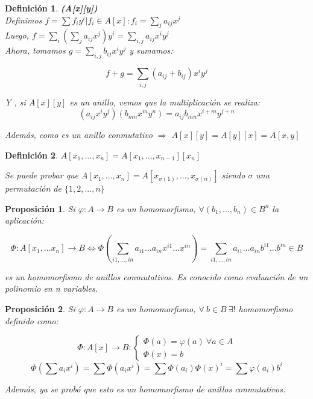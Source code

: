 \documentclass[11pt, a4paper, titlepage]{article}
\theoremstyle{theorem-style}
\newtheorem*{nprop}{Proposición}
\theoremstyle{definition-style}
\newtheorem*{ndef}{Definición}
\theoremstyle{remark-style}
\theoremstyle{example-style}
\begin{document}
\begin{ndef} \textbf{(A[x][y])}
\hfill \\
Definimos $f=\sum f_i y^i | f_i \in A[x] : f_i = \sum_j a_{ij}x^j$\\
Luego, $f = \sum_i (\sum_j a_{ij}x^j)y^i = \sum_{i,j} a_{ij}x^iy^j$\\

Ahora, tomamos $g =\sum_{i,j} b_{ij}x^iy^j$ y sumamos:

\[
f+g = \sum_{i,j}(a_{ij}+b_{ij})x^iy^j
\]

Y , si $A[x][y]$ es un anillo, vemos que la multiplicación se realiza:
\[
(a_{ij}x^iy^j)(b_{mn}x^my^n) = a_{ij}b_{mn} x^{i+m}y^{j+n}
\]


Además, como es un anillo conmutativo $\Rightarrow$ $A[x][y] = A[y][x] = A[x,y]$

	
\end{ndef}


\begin{ndef}
	$A[x_1,...,x_n] = A[x_1,...,x_{n-1}][x_n]$

Se puede probar que $A[x_1,...,x_n] = A[x_{\sigma(1)},...,x_{\sigma(n)}]$ siendo $\sigma$ una permutación de $\{1,2,...,n \}$
\end{ndef}

\newpage

\begin{nprop}
	
Si $\varphi :A \to B$ es un homomorfismo, $\forall(b_1,...,b_n) \in B^n$ la aplicación:

\[
\Phi:A[x_1,...x_n] \to B \iff \Phi(\sum_{i1,...,in}a_{i1}...a_{in}x^{i1}... x^{in}) = \sum_{i1,...,in}a_{i1}...a_{in}b^{i1}... b^{in} \in B
\]

es un homomorfismo de anillos conmutativos. Es conocido como evaluación de un polinomio en n variables.

\end{nprop}



\begin{nprop}
	Si $\varphi:A \to B$ es un homomorfismo, $\forall\  b \in B\  \exists ! $ homomorfismo definido como:
	
\[
\Phi:A[x] \to B : \begin{cases}
	\Phi(a) = \varphi(a)\ \forall a \in A \\
	\Phi(x) = b 
\end{cases}
\]
\[
\Phi(\sum a_i x^i) = \sum \Phi(a_i x^i) =  \sum \Phi(a_i) \Phi(x)^i = \sum \varphi(a_i) b^i
\]

Además, ya se probó que esto es un homomorfismo de anillos conmutativos.

\end{nprop}
\end{document}
